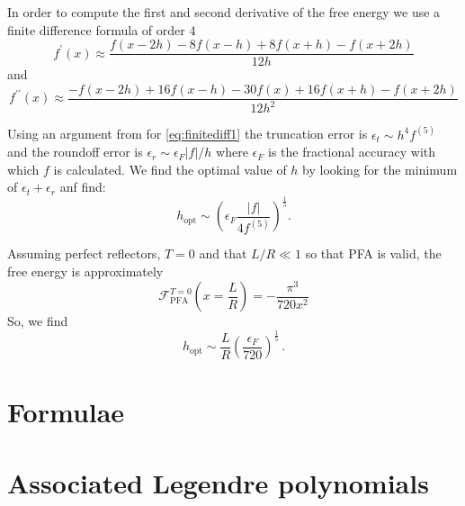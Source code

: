 \documentclass[superscriptaddress,prb]{revtex4-1}
\begin{document}
In order to compute the first and second derivative of the free energy we use a
finite difference formula \cite{finitediff} of order 4
\begin{equation}
\label{eq:finitediff1}
f^\prime(x) \approx \frac{f(x-2h) -8f(x-h) + 8f(x+h)  -f(x+2h)}{12h}
\end{equation}
and
\begin{equation}
\label{eq:finitediff2}
f^{\prime\prime}(x) \approx \frac{-f(x-2h) +16f(x-h) -30f(x) + 16f(x+h) -f(x+2h)}{12h^2}
\end{equation}

Using an argument from \cite{NumericalRecipes} for \eqref{eq:finitediff1} the truncation error
is $\epsilon_t \sim h^4 f^{(5)}$ and the roundoff error is $\epsilon_r \sim \epsilon_F |f|/h$ where $\epsilon_F$
is the fractional accuracy with which $f$ is calculated. We find the optimal value of $h$ by looking
for the minimum of $\epsilon_t + \epsilon_r$ anf find:
\begin{equation}
h_\text{opt} \sim \left( \epsilon_F \frac{|f|}{4f^{(5)}} \right)^\frac{1}{5} .
\end{equation}

Assuming perfect reflectors, $T=0$ and that $L/R \ll 1$ so that PFA is valid, the free energy is approximately
\begin{equation}
\mathcal{F}_\text{PFA}^{T=0}\left(x=\frac{L}{R}\right) = -\frac{\pi^3}{720x^2}
\end{equation}
So, we find
\begin{equation}
h_\text{opt} \sim \frac{L}{R} \left(\frac{\epsilon_F}{720}\right)^\frac{1}{5} \,.
\end{equation}

\appendix

\section{Formulae}


\section{Associated Legendre polynomials}
\end{document}

